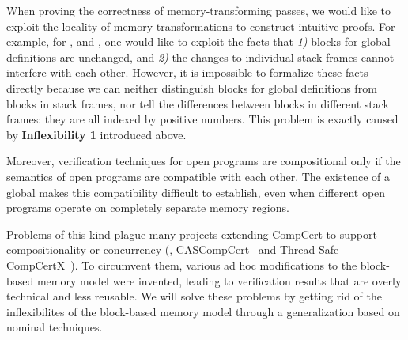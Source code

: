 When proving the correctness of memory-transforming passes,
we would like to exploit the locality of memory
transformations to construct intuitive proofs. For example, for
,  and , one would
like to exploit the facts that \emph{1)} blocks for global definitions
are unchanged, and \emph{2)} the changes to individual stack frames
cannot interfere with each other. However, it is impossible to
formalize these facts directly because we can neither distinguish
blocks for global definitions from blocks in stack frames, nor tell
the differences between blocks in different stack frames: they are all
indexed by positive numbers. This problem is exactly caused by
\textbf{Inflexibility 1} introduced above.

Moreover,
verification techniques for open programs are compositional only if
the semantics of open programs are compatible with each other.
The existence of a global \nextblock makes this compatibility
difficult to establish, even when different open programs operate
on completely separate memory regions.

Problems of this kind plague many projects
extending CompCert to support compositionality or concurrency (\eg,
CASCompCert~\cite{cascompcert} and Thread-Safe
CompCertX~\cite{ccal18}). To circumvent them, various ad hoc
modifications to the block-based memory model were invented, leading to
verification results that are overly technical and less reusable.
We will solve these problems by getting rid of the inflexibilites of
the block-based memory model through a generalization based on nominal
techniques.

